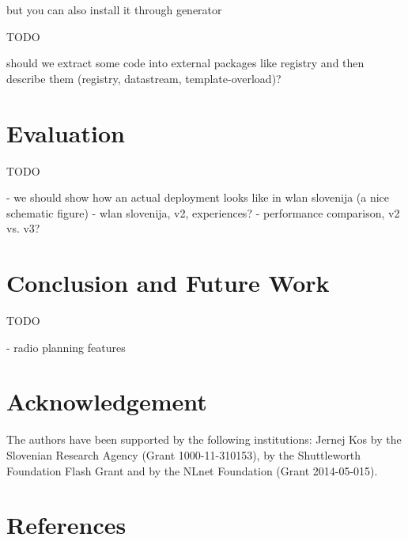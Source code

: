 \documentclass[5p,sort&compress]{elsarticle}
\begin{document}
but you can also install it through generator

TODO

should we extract some code into external packages like registry and then describe them (registry, datastream, template-overload)?

\section{Evaluation}
\label{sec:evaluation}

TODO

- we should show how an actual deployment looks like in wlan slovenija (a nice schematic figure)
- wlan slovenija, v2, experiences?
- performance comparison, v2 vs. v3?

\section{Conclusion and Future Work}
\label{sec:conclusion}

TODO

- radio planning features

\section*{Acknowledgement}

The authors have been supported by the following institutions: Jernej Kos by the Slovenian Research Agency (Grant 1000-11-310153), by the Shuttleworth Foundation Flash Grant and by the NLnet Foundation (Grant 2014-05-015).

\section*{References}

\end{document}
